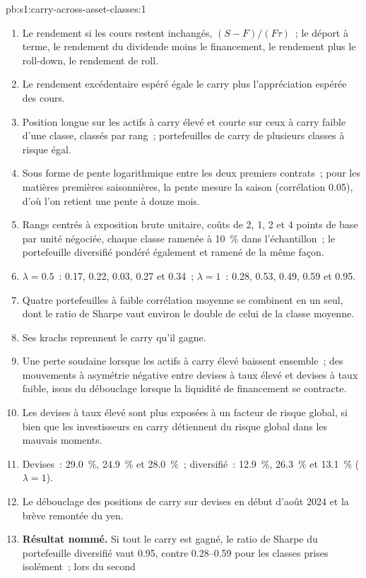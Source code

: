 \begin{solution}{pb:s1:carry-across-asset-classes:1}
\begin{enumerate}
\item Le rendement si les cours restent inchangés, $(S - F)/(F\tau)$~; le déport à terme, le rendement du dividende moins le financement, le rendement plus le roll-down, le rendement de roll.
\item Le rendement excédentaire espéré égale le carry plus l'appréciation espérée des cours.
\item Position longue sur les actifs à carry élevé et courte sur ceux à carry faible d'une classe, classés par rang~; portefeuilles de carry de plusieurs classes à risque égal.
\item Sous forme de pente logarithmique entre les deux premiers contrats~; pour les matières premières saisonnières, la pente mesure la saison (corrélation 0.05), d'où l'on retient une
pente à douze mois.
\item Rangs centrés à exposition brute unitaire, coûts de 2, 1, 2 et 4 points de base par unité négociée, chaque classe ramenée à 10~\% dans l'échantillon~; le portefeuille diversifié pondéré également
et ramené de la même façon.
\item $\lambda = 0.5$~: 0.17, 0.22, 0.03, 0.27 et 0.34~; $\lambda = 1$~: 0.28, 0.53, 0.49, 0.59 et 0.95.
\item Quatre portefeuilles à faible corrélation moyenne se combinent en un seul, dont le ratio de Sharpe vaut environ le double de celui de la classe moyenne.
\item Ses krachs reprennent le carry qu'il gagne.
\item Une perte soudaine lorsque les actifs à carry élevé baissent ensemble~; des mouvements à asymétrie négative entre devises à taux élevé et devises à taux faible, issus du débouclage lorsque la liquidité de financement
se contracte.
\item Les devises à taux élevé sont plus exposées à un facteur de risque global, si bien que les investisseurs en carry détiennent du risque global dans les mauvais moments.
\item Devises~: 29.0~\%, 24.9~\% et 28.0~\%~; diversifié~: 12.9~\%, 26.3~\% et 13.1~\% ($\lambda = 1$).
\item Le débouclage des positions de carry sur devises en début d'août 2024 et la brève remontée du yen.
\item \textbf{Résultat nommé.} Si tout le carry est gagné, le ratio de Sharpe du portefeuille diversifié vaut 0.95, contre 0.28--0.59 pour les classes prises isolément~; lors du second

\end{enumerate}
\end{solution}
